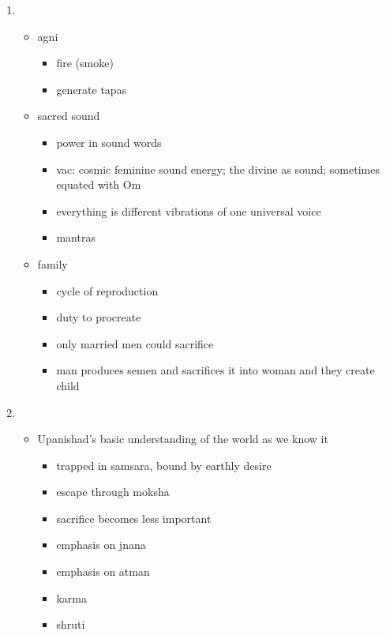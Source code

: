 \documentclass[11pt]{article} %
\begin{document}
\begin{enumerate}

\item
\begin{itemize}
	\item agni
	\begin{itemize}
		\item fire (smoke)
		\item generate tapas
	\end{itemize}

	\item sacred sound
	\begin{itemize}
		\item power in sound words
		\item vac: cosmic feminine sound energy; the divine as sound;
					sometimes equated with Om
		\item everything is different vibrations of one universal voice
		\item mantras
	\end{itemize}

	\item family
	\begin{itemize}
		\item cycle of reproduction
		\item duty to procreate
		\item only married men could sacrifice
		\item man produces semen and sacrifices it into woman and they create child
	\end{itemize}

\end{itemize}


\pagebreak

\item
\begin{itemize}
	\item Upanishad's basic understanding of the world as we know it
	\begin{itemize}
		\item trapped in samsara, bound by earthly desire
		\item escape through moksha
		\item sacrifice becomes less important
		\item emphasis on jnana
		\item emphasis on atman
		\item karma
		\item shruti
	\end{itemize}
\end{itemize}


\end{enumerate}
\end{document}
